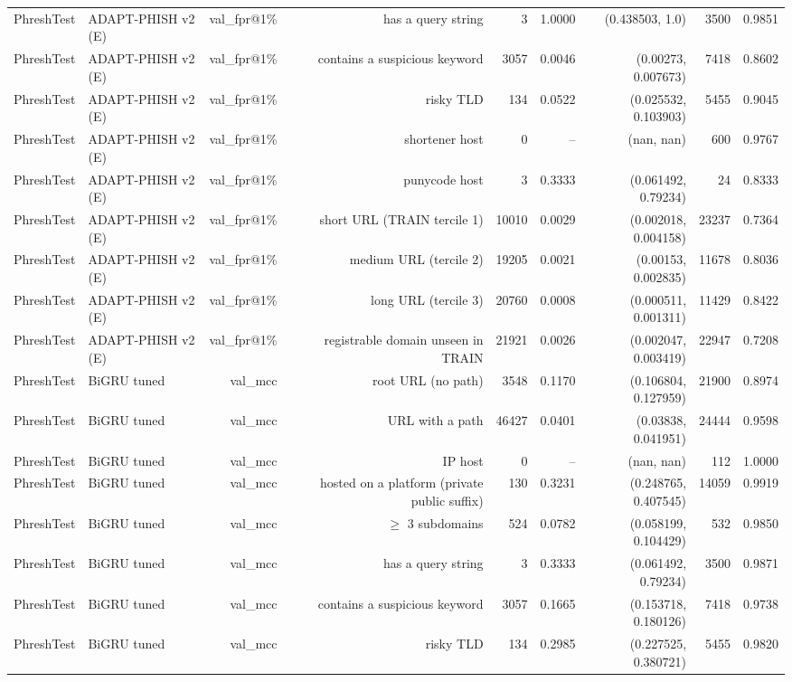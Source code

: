 \begin{table}[t]
\begin{tabular}{llrrrrrrr}
PhreshTest & ADAPT-PHISH v2 (E) & val\_fpr@1\% & has a query string & 3 & 1.0000 & (0.438503, 1.0) & 3500 & 0.9851 \\
PhreshTest & ADAPT-PHISH v2 (E) & val\_fpr@1\% & contains a suspicious keyword & 3057 & 0.0046 & (0.00273, 0.007673) & 7418 & 0.8602 \\
PhreshTest & ADAPT-PHISH v2 (E) & val\_fpr@1\% & risky TLD & 134 & 0.0522 & (0.025532, 0.103903) & 5455 & 0.9045 \\
PhreshTest & ADAPT-PHISH v2 (E) & val\_fpr@1\% & shortener host & 0 & -- & (nan, nan) & 600 & 0.9767 \\
PhreshTest & ADAPT-PHISH v2 (E) & val\_fpr@1\% & punycode host & 3 & 0.3333 & (0.061492, 0.79234) & 24 & 0.8333 \\
PhreshTest & ADAPT-PHISH v2 (E) & val\_fpr@1\% & short URL (TRAIN tercile 1) & 10010 & 0.0029 & (0.002018, 0.004158) & 23237 & 0.7364 \\
PhreshTest & ADAPT-PHISH v2 (E) & val\_fpr@1\% & medium URL (tercile 2) & 19205 & 0.0021 & (0.00153, 0.002835) & 11678 & 0.8036 \\
PhreshTest & ADAPT-PHISH v2 (E) & val\_fpr@1\% & long URL (tercile 3) & 20760 & 0.0008 & (0.000511, 0.001311) & 11429 & 0.8422 \\
PhreshTest & ADAPT-PHISH v2 (E) & val\_fpr@1\% & registrable domain unseen in TRAIN & 21921 & 0.0026 & (0.002047, 0.003419) & 22947 & 0.7208 \\
PhreshTest & BiGRU tuned & val\_mcc & root URL (no path) & 3548 & 0.1170 & (0.106804, 0.127959) & 21900 & 0.8974 \\
PhreshTest & BiGRU tuned & val\_mcc & URL with a path & 46427 & 0.0401 & (0.03838, 0.041951) & 24444 & 0.9598 \\
PhreshTest & BiGRU tuned & val\_mcc & IP host & 0 & -- & (nan, nan) & 112 & 1.0000 \\
PhreshTest & BiGRU tuned & val\_mcc & hosted on a platform (private public suffix) & 130 & 0.3231 & (0.248765, 0.407545) & 14059 & 0.9919 \\
PhreshTest & BiGRU tuned & val\_mcc & $\geq$ 3 subdomains & 524 & 0.0782 & (0.058199, 0.104429) & 532 & 0.9850 \\
PhreshTest & BiGRU tuned & val\_mcc & has a query string & 3 & 0.3333 & (0.061492, 0.79234) & 3500 & 0.9871 \\
PhreshTest & BiGRU tuned & val\_mcc & contains a suspicious keyword & 3057 & 0.1665 & (0.153718, 0.180126) & 7418 & 0.9738 \\
PhreshTest & BiGRU tuned & val\_mcc & risky TLD & 134 & 0.2985 & (0.227525, 0.380721) & 5455 & 0.9820 \\

\end{tabular}
\end{table}

